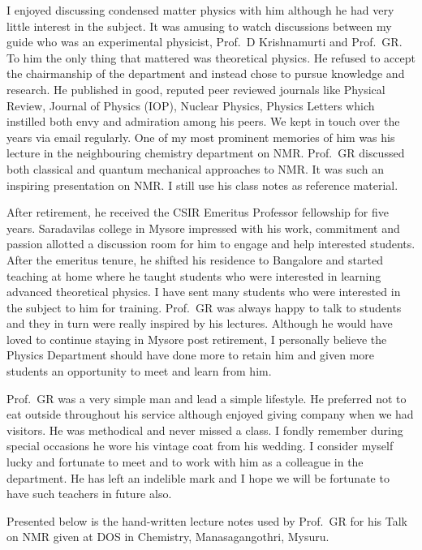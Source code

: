 I enjoyed discussing condensed matter physics with him although he had very little interest in the subject. It was
amusing to watch discussions between my guide who was an experimental physicist, Prof.\ D Krishnamurti and
Prof.\ GR. To him the only thing that mattered was theoretical physics. He refused to accept the chairmanship
of the department and instead chose to pursue knowledge and research. He published in good, reputed peer
reviewed journals like Physical Review, Journal of Physics (IOP), Nuclear Physics, Physics Letters which instilled
both envy and admiration among his peers. We kept in touch over the years via email regularly. One of my most prominent memories of him was his lecture in the neighbouring chemistry department on NMR. Prof.\ GR discussed 
both classical and quantum mechanical approaches to NMR. It was such an inspiring presentation on NMR. I still
use his class notes as reference material.

After retirement, he received the CSIR Emeritus Professor fellowship for five years. Saradavilas college in
Mysore impressed with his work, commitment and passion allotted a discussion room for him to engage and
help interested students. After the emeritus tenure, he shifted his residence to Bangalore and started teaching at
home where he taught students who were interested in learning advanced theoretical physics. I have sent many
students who were interested in the subject to him for training. Prof.\ GR was always happy to talk to students and
they in turn were really inspired by his lectures. Although he would have loved to continue staying in Mysore post
retirement, I personally believe the Physics Department should have done more to retain him and given more
students an opportunity to meet and learn from him.
\newpage

Prof.\ GR was a very simple man and lead a simple lifestyle. He preferred not to eat outside throughout his
service although enjoyed giving company when we had visitors. He was methodical and never missed a class. I
fondly remember during special occasions he wore his vintage coat from his wedding. I consider myself lucky and
fortunate to meet and to work with him as a colleague in the department. He has left an indelible mark and I
hope we will be fortunate to have such teachers in future also.

Presented below is the hand-written lecture notes used by Prof.\ GR for his 
Talk on NMR given at DOS in Chemistry, Manasagangothri, Mysuru.

